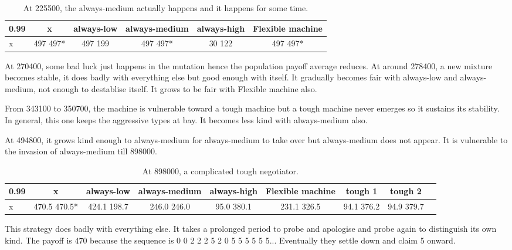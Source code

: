 \documentclass[12.5pt]{report}
\begin{document}
\begin{table}[h!]
\center
\begin{tabular}{l|ccccc}
\textbf{0.99}& x & always-low & always-medium & always-high & Flexible machine\\
\hline

x & 497 497* & 497 199  &  497 497*  & 30 122  &  497 497*  \\
\end{tabular}
\caption{At 225500, the always-medium actually happens and it happens for some time.}
\end{table}

At 270400, some bad luck just happens in the mutation hence the population payoff average reduces. At around 278400, a new mixture becomes stable, it does badly with everything else but good enough with itself. It gradually becomes fair with always-low and always-medium, not enough to destablise itself. It grows to be fair with Flexible machine also.

From 343100 to 350700, the machine is vulnerable toward a tough machine but a tough machine never emerges so it sustains its stability. In general, this one keeps the aggressive types at bay. It becomes less kind with always-medium also.

At 494800, it grows kind enough to always-medium for always-medium to take over but always-medium does not appear. It is vulnerable to the invasion of always-medium till 898000. 
\begin{table}[h!]
\center
\begin{tabular}{l|cccccccc}
\textbf{0.99}& x & always-low & always-medium & always-high & Flexible machine &tough 1 & tough 2\\
\hline
x& 470.5 470.5* &424.1 198.7&  246.0 246.0 &  95.0 380.1 & 231.1 326.5&   94.1 376.2 &  94.9 379.7\\  
\end{tabular}
\caption{At 898000, a complicated tough negotiator.}
\end{table}
This strategy does badly with everything else. It takes a prolonged period to probe and apologise and probe again to distinguish its own kind. The payoff is 470 because the sequence is 0 0 2 2 2 5 2 0 5 5 5 5 5 5... Eventually they settle down and claim 5 onward.
\end{document}
